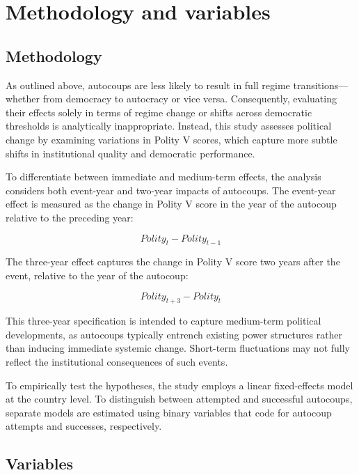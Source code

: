 \documentclass[
  12pt,
]{report}
\begin{document}
\section{Methodology and variables}\label{methodology-and-variables}

\subsection*{Methodology}\label{methodology-1}

As outlined above, autocoups are less likely to result in full regime
transitions---whether from democracy to autocracy or vice versa.
Consequently, evaluating their effects solely in terms of regime change
or shifts across democratic thresholds is analytically inappropriate.
Instead, this study assesses political change by examining variations in
Polity V scores, which capture more subtle shifts in institutional
quality and democratic performance.

To differentiate between immediate and medium-term effects, the analysis
considers both event-year and two-year impacts of autocoups. The
event-year effect is measured as the change in Polity V score in the
year of the autocoup relative to the preceding year:

\[
Polity_{t} - Polity_{t-1}
\]

The three-year effect captures the change in Polity V score two years
after the event, relative to the year of the autocoup:

\[
Polity_{t+3} - Polity_t
\]

This three-year specification is intended to capture medium-term
political developments, as autocoups typically entrench existing power
structures rather than inducing immediate systemic change. Short-term
fluctuations may not fully reflect the institutional consequences of
such events.

To empirically test the hypotheses, the study employs a linear
fixed-effects model at the country level. To distinguish between
attempted and successful autocoups, separate models are estimated using
binary variables that code for autocoup attempts and successes,
respectively.

\subsection*{Variables}\label{variables}
\end{document}

